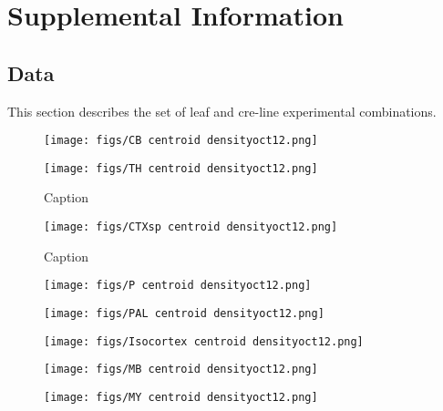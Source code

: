 \section{Supplemental Information}

\subsection{Data}
\label{supp_sec:data}

This section describes the set of leaf and cre-line experimental combinations.

\newpage

\begin{figure}[H]
    \centering
    \texttt{[image: figs/CB centroid densityoct12.png]}
    \label{fig:my_label}
\end{figure}
\newpage

\begin{figure}[H]
    \centering
    \texttt{[image: figs/TH centroid densityoct12.png]}
    \caption{Caption}
    \label{fig:my_label}
\end{figure}
\newpage

\begin{figure}[H]
    \centering
    \texttt{[image: figs/CTXsp centroid densityoct12.png]}
    \caption{Caption}
    \label{fig:my_label}
\end{figure}
\newpage

\begin{figure}[H]
    \centering
    \texttt{[image: figs/P centroid densityoct12.png]}
    \label{fig:my_label}
\end{figure}
\newpage

\begin{figure}[H]
    \centering
    \texttt{[image: figs/PAL centroid densityoct12.png]} 
    \label{fig:my_label}
\end{figure}
\newpage

\begin{figure}[H]
    \centering
    \texttt{[image: figs/Isocortex centroid densityoct12.png]}
    \label{fig:my_label}
\end{figure}
\newpage

\begin{figure}[H]
    \centering
    \texttt{[image: figs/MB centroid densityoct12.png]} 
    \label{fig:my_label}
\end{figure}
\newpage

\begin{figure}[H]
    \centering
    \texttt{[image: figs/MY centroid densityoct12.png]} 
    \label{fig:my_label}
\end{figure}
\newpage


